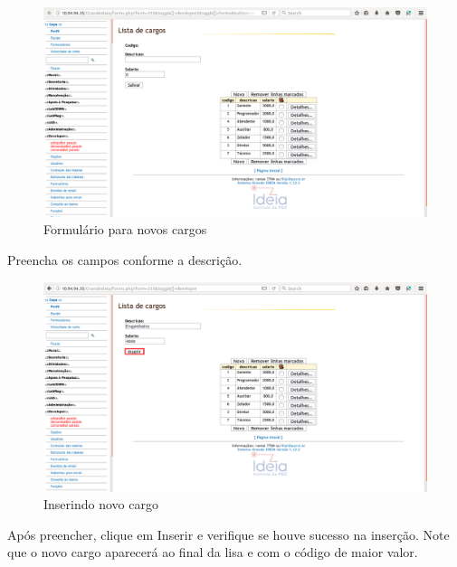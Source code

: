 \documentclass[9pt]{report}
\begin{document}
{       \begin{figure}[H]
        \includegraphics[width=\textwidth]{2_Formularios/3_Relacionamento_1_N/31.png}
        \caption{Formulário para novos cargos}
        \label{fig:novoscargos}
       \end{figure}

       Preencha os campos conforme a descrição.

       \begin{figure}[H]
        \includegraphics[width=\textwidth]{2_Formularios/3_Relacionamento_1_N/32.png}
        \caption{Inserindo novo cargo}
        \label{fig:novocargo}
       \end{figure}

       Após preencher, clique em Inserir e verifique se houve sucesso
       na inserção. Note que o novo cargo aparecerá ao final da lisa
       e com o código de maior valor.

}
\end{document}
